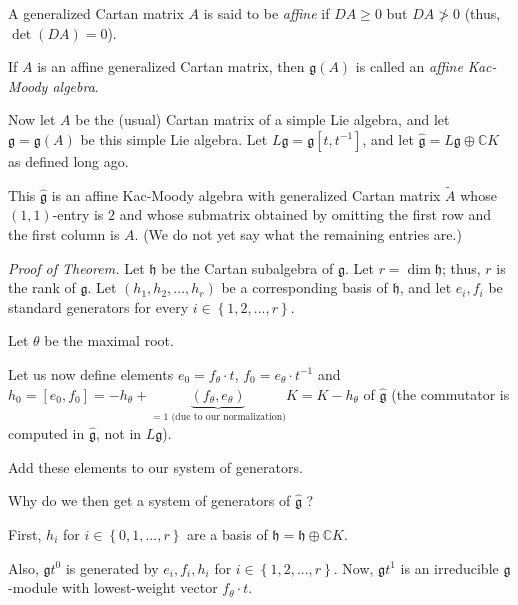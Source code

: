 \documentclass[etingof-lie.tex]{subfiles}
\begin{document}
\begin{definition}
A generalized Cartan matrix $A$ is said to be \textit{affine} if $DA\geq0$ but
$DA\not >  0$ (thus, $\det\left(  DA\right)  =0$).
\end{definition}

\begin{definition}
If $A$ is an affine generalized Cartan matrix, then $\mathfrak{g}\left(
A\right)  $ is called an \textit{affine Kac-Moody algebra}.
\end{definition}

Now let $A$ be the (usual) Cartan matrix of a simple Lie algebra, and let
$\mathfrak{g}=\mathfrak{g}\left(  A\right)  $ be this simple Lie algebra. Let
$L\mathfrak{g}=\mathfrak{g}\left[  t,t^{-1}\right]  $, and let
$\widehat{\mathfrak{g}}=L\mathfrak{g}\oplus\mathbb{C}K$ as defined long ago.

\begin{theorem}
This $\widehat{\mathfrak{g}}$ is an affine Kac-Moody algebra with generalized
Cartan matrix $\widetilde{A}$ whose $\left(  1,1\right)  $-entry is $2$ and
whose submatrix obtained by omitting the first row and the first column is
$A$. (We do not yet say what the remaining entries are.)
\end{theorem}

\textit{Proof of Theorem.} Let $\mathfrak{h}$ be the Cartan subalgebra of
$\mathfrak{g}$. Let $r=\dim\mathfrak{h}$; thus, $r$ is the rank of
$\mathfrak{g}$. Let $\left(  h_{1},h_{2},...,h_{r}\right)  $ be a
corresponding basis of $\mathfrak{h}$, and let $e_{i},f_{i}$ be standard
generators for every $i\in\left\{  1,2,...,r\right\}  $.

Let $\theta$ be the maximal root.

Let us now define elements $e_{0}=f_{\theta}\cdot t$, $f_{0}=e_{\theta}\cdot
t^{-1}$ and $h_{0}=\left[  e_{0},f_{0}\right]  =-h_{\theta}%
+\underbrace{\left(  f_{\theta},e_{\theta}\right)  }_{=1\text{ (due to our
normalization)}}K=K-h_{\theta}$ of $\widehat{\mathfrak{g}}$ (the commutator is
computed in $\widehat{\mathfrak{g}}$, not in $L\mathfrak{g}$).

Add these elements to our system of generators.

Why do we then get a system of generators of $\widehat{\mathfrak{g}}$ ?

First, $h_{i}$ for $i\in\left\{  0,1,...,r\right\}  $ are a basis of
$\widehat{\mathfrak{h}}=\mathfrak{h}\oplus\mathbb{C}K$.

Also, $\mathfrak{g}t^{0}$ is generated by $e_{i},f_{i},h_{i}$ for
$i\in\left\{  1,2,...,r\right\}  $. Now, $\mathfrak{g}t^{1}$ is an irreducible
$\mathfrak{g}$-module with lowest-weight vector $f_{\theta}\cdot t$.
\end{document}
